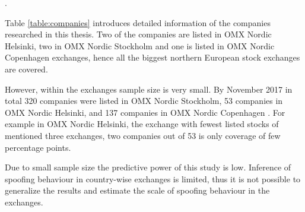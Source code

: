 \documentclass{tut-thesis}
\begin{document}

.

Table \ref{table:companies} introduces detailed information of the companies researched in this thesis. Two of the companies are listed in OMX Nordic Helsinki, two in OMX Nordic Stockholm and one is listed in OMX Nordic Copenhagen exchanges, hence all the biggest northern European stock exchanges are covered.

However, within the exchanges sample size is very small. By November 2017 in total 320 companies were listed in OMX Nordic Stockholm, 53 companies in OMX Nordic Helsinki, and 137 companies in OMX Nordic Copenhagen \autocite{GlobeNewswire2018b}. For example in OMX Nordic Helsinki, the exchange with fewest listed stocks of mentioned three exchanges, two companies out of 53 is only coverage of few percentage points.

Due to small sample size the predictive power of this study is low. Inference of spoofing behaviour in country-wise exchanges is limited, thus it is not possible to generalize the results and estimate the scale of spoofing behaviour in the exchanges. 

\end{document}
